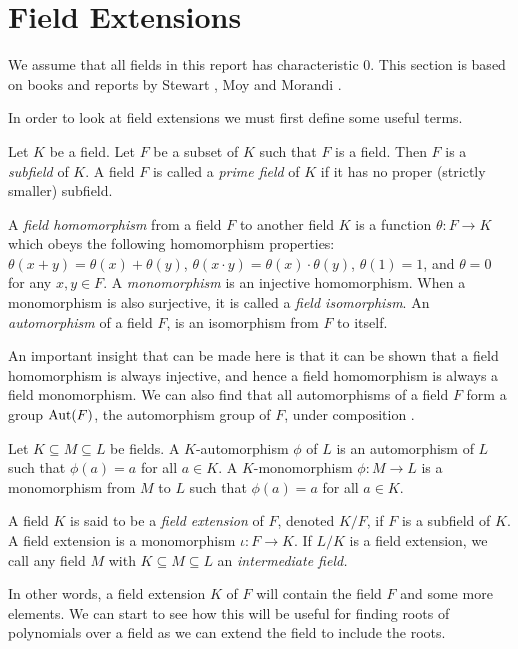 \section{Field Extensions} \label{sec:ext}
We assume that all fields in this report has characteristic $0$.  This section is based on books and reports by Stewart \cite[Chapters~4-5]{Stewart}, Moy \cite{Moy} and Morandi \cite[Chapter~1]{ morandi_field_1996}. 

In order to look at field extensions we must first define some useful terms. 
\begin{definition}
Let $K$ be a field. Let \(F\) be a subset of \(K\) such that $F$ is a field. Then $F$ is a \textit{subfield}
 of $K$.
A field \(F\) is called a \textit{prime field} of \(K\) if it has no proper (strictly smaller) subfield.
\end{definition}
\begin{definition}
	A \textit{field homomorphism} from a field $F$ to another field $K$ is a function $\theta: F \to K$ which obeys the following homomorphism properties: $\theta(x + y) = \theta(x) + \theta(y)$, $\theta(x\cdot y) = \theta(x) \cdot \theta(y)$, $\theta(1) = 1$, and $\theta = 0$ for any $x, y \in F$. 
    A \textit{monomorphism} is an injective homomorphism. 
	When a monomorphism is also surjective, it is called a \textit{field isomorphism}. An \textit{automorphism} of a field $F$, is an isomorphism from $F$ to itself.
\end{definition}

An important insight that can be made here is that it can be shown that a field homomorphism is always injective, and hence a field homomorphism is always a field monomorphism.
We can also find that all automorphisms of a field $F$ form a group $\operatorname{Aut}(F)$, the automorphism group of $F$, under composition \cite[p.~15]{morandi_field_1996}.

\begin{definition} \label{def:automorphism}
	Let $K \subseteq M \subseteq L$ be fields. A $K$-automorphism $\phi$ of $L$ is an automorphism of $L$ such that $\phi(a) = a$ for all $a \in K$. 
	A $K$-monomorphism $\phi : M \to L$ is a monomorphism from $M$ to $L$ such that $\phi(a) = a$ for all $a \in K$. 
\end{definition}

\begin{definition}
A field \(K\) is said to be a \textit{field extension} of \(F\), denoted \(K / F\), if \(F\) is a subfield of \(K\).  A field extension is a monomorphism \(\iota: F \to K\). If $L/K$ is a field extension, we call any field $M$ with $K \subseteq M \subseteq L$ an \textit{intermediate field.}
\end{definition}
In other words, a field extension \(K\) of \(F\) will contain the field \(F\) and some more elements. We can start to see how this will be useful for finding roots of polynomials over a field as we can extend the field to include the roots.

